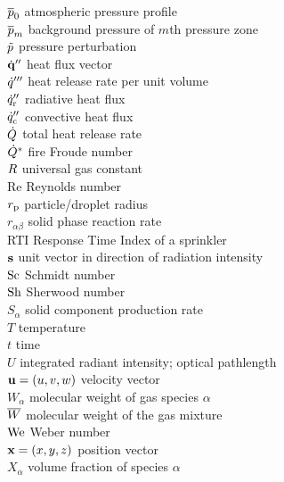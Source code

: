 \begin{tabbing}
$\overline{p}_0$                   \> atmospheric pressure profile \\
$\overline{p}_m$                   \> background pressure of $m$th pressure zone \\
$\tilde{p}$                     \> pressure perturbation \\
$\dot{\mathbf{q}}''$                  \> heat flux vector \\
$\dot{q}'''$                  \> heat release rate per unit volume \\
$\dot{q}_{\rm r}''$           \> radiative heat flux \\
$\dot{q}_{\rm c}''$           \> convective heat flux \\
$\dot{Q}$                     \> total heat release rate \\
$\dot{Q}^*$                   \> fire Froude number \\
$R$                      \> universal gas constant \\
Re                        \> Reynolds number \\
$r_{\rm p}$               \> particle/droplet radius \\
$r_{\alpha\beta}$         \> solid phase reaction rate \\
RTI                       \> Response Time Index of a sprinkler \\
${\mathbf{s}}$                     \> unit vector in direction of radiation intensity \\
$\hbox{Sc}$                     \> Schmidt number \\
$\hbox{Sh}$                     \> Sherwood number \\
$S_\alpha$                \> solid component production rate \\
$T$                       \> temperature \\
$t$                       \> time           \\
$U$                       \> integrated radiant intensity; optical pathlength \\
${\mathbf{u}}=(u,v,w)$             \> velocity vector  \\
$W_\alpha$                \> molecular weight of gas species $\alpha$ \\
$\overline{W}$                     \> molecular weight of the gas mixture \\
$\hbox{We}$                     \> Weber number \\
${\mathbf{x}}=(x,y,z)$             \> position vector  \\
$X_\alpha$                \> volume fraction of species $\alpha$   \\

\end{tabbing}
